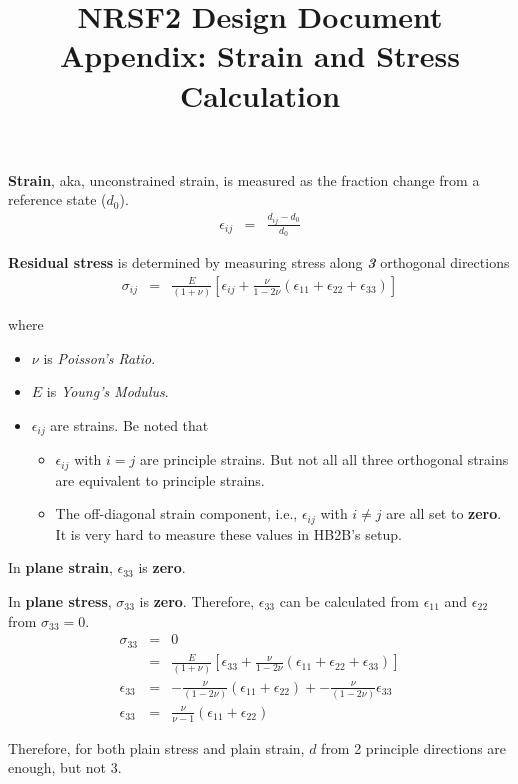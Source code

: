\documentclass[12pt,bezier,amstex]{report}  %
\title{NRSF2 Design Document Appendix: Strain and Stress Calculation}
\begin{document}
\maketitle

{\bf Strain}, aka, unconstrained strain, is measured as the fraction change from a reference state ($d_0$).
\begin{eqnarray}
\epsilon_{ij} &=& \frac{d_{ij} - d_0}{d_0}
\end{eqnarray}

{\bf Residual stress} is determined by measuring stress along {\bf\it 3} orthogonal directions
\begin{eqnarray}
\sigma_{ij} &=&
	\frac{E}{(1 + \nu)}[\epsilon_{ij} + \frac{\nu}{1-2\nu}(\epsilon_{11} + \epsilon_{22} + \epsilon_{33})]
\end{eqnarray}

where 
\begin{itemize}
\item $\nu$ is {\it Poisson's Ratio}.
\item $E$ is {\it Young's Modulus}.
\item $\epsilon_{ij}$ are strains.  Be noted that 
	\begin{itemize}
	\item  $\epsilon_{ij}$ with $i = j$ are principle strains.  But not all all three orthogonal strains are equivalent to principle strains.
	\item The off-diagonal strain component, i.e., $\epsilon_{ij}$ with $i\neq j$ are all set to {\bf zero}.  It is very hard to measure these values in HB2B's setup.
	\end{itemize}
\end{itemize}

In {\bf plane strain}, $\epsilon_{33}$ is {\bf zero}.

In {\bf plane stress}, $\sigma_{33}$ is {\bf zero}.  
Therefore, $\epsilon_{33}$ can be calculated from $\epsilon_{11}$ and $\epsilon_{22}$ from $\sigma_{33} = 0$. 
\begin{eqnarray}
\sigma_{33}
	&=&	0	\\
	&=& \frac{E}{(1 + \nu)}[\epsilon_{33} + \frac{\nu}{1-2\nu}(\epsilon_{11} + \epsilon_{22} + \epsilon_{33})]	\\
\epsilon_{33}
	&=& - \frac{\nu}{(1-2\nu)} (\epsilon_{11} + \epsilon_{22}) + - \frac{\nu}{(1-2\nu)} \epsilon_{33} \\
\epsilon_{33} 
	&=& \frac{\nu}{\nu-1}(\epsilon_{11} + \epsilon_{22})
\end{eqnarray}

Therefore, for both plain stress and plain strain, $d$ from 2 principle directions are enough, but not 3.
\end{document}
